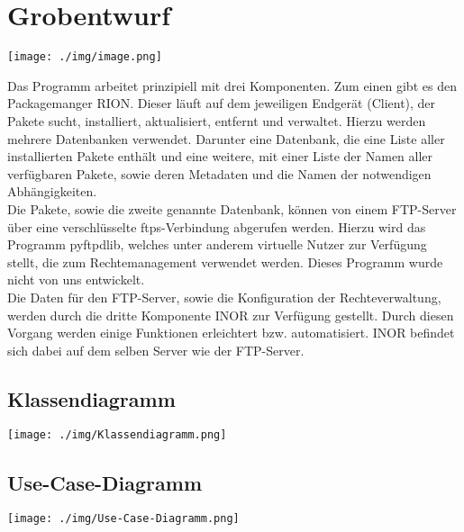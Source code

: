 \chapter{Grobentwurf}
\begin{minipage}{\linewidth}
\centering%
\texttt{[image: ./img/image.png]}%
\centering
{}%
\label{fig:Use-Case-Diagramm}%
\end{minipage}
\vspace{10px}

Das Programm arbeitet prinzipiell mit drei Komponenten. Zum einen gibt es den
Packagemanger RION. Dieser läuft auf dem jeweiligen Endgerät (Client), der Pakete sucht,
installiert, aktualisiert, entfernt und verwaltet. Hierzu werden mehrere Datenbanken
verwendet. Darunter eine Datenbank, die eine Liste aller installierten Pakete enthält und eine
weitere, mit einer Liste der Namen aller verfügbaren Pakete, sowie deren Metadaten und die
Namen der notwendigen Abhängigkeiten. \\


Die Pakete, sowie die zweite genannte Datenbank, können von einem FTP-Server über eine
verschlüsselte ftps-Verbindung abgerufen werden. Hierzu wird das Programm pyftpdlib,
welches unter anderem virtuelle Nutzer zur Verfügung stellt, die zum Rechtemanagement
verwendet werden. Dieses Programm wurde nicht von uns entwickelt.
\\

Die Daten für den FTP-Server, sowie die Konfiguration der Rechteverwaltung, werden durch
die dritte Komponente INOR zur Verfügung gestellt. Durch diesen Vorgang werden einige
Funktionen erleichtert bzw. automatisiert. INOR befindet sich dabei auf dem selben Server
wie der FTP-Server.\\   

\section{Klassendiagramm}
\begin{minipage}{\linewidth}
\centering%
\texttt{[image: ./img/Klassendiagramm.png]}%
%
\label{fig:Klassendiagramm}%
\end{minipage}
\vspace{10px}





\section{Use-Case-Diagramm}
\begin{minipage}{\linewidth}
\centering%
\texttt{[image: ./img/Use-Case-Diagramm.png]}%
\centering
{}%
\label{fig:Use-Case-Diagramm}%
\end{minipage}
\vspace{10px}

